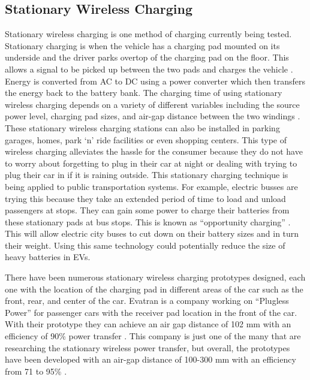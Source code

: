 \subsection{Stationary Wireless Charging }
Stationary wireless charging is one method of charging currently being tested. Stationary charging is when the 
vehicle has a charging pad mounted on its underside and the driver parks overtop of the charging pad on the floor. 
This allows a signal to be picked up between the two pads and charges the vehicle 
\cite{fisher_electric_2014}. Energy is converted from AC to DC using a power converter which then 
transfers the energy back to the battery bank. The charging time of using stationary wireless charging depends on a 
variety of different variables including the source power level, charging pad sizes, and air-gap distance between 
the two windings \cite{panchal_review_2018}. These stationary wireless charging stations can also be installed 
in parking garages, homes, park ‘n’ ride facilities or even shopping centers. This type of wireless charging 
alleviates the hassle for the consumer because they do not have to worry about forgetting to plug in their car at 
night or dealing with trying to plug their car in if it is raining outside. This stationary charging technique is 
being applied to public transportation systems. For example, electric busses are trying this because they take an 
extended period of time to load and unload passengers at stops. They can gain some power to charge their batteries 
from these stationary pads at bus stops. This is known as “opportunity charging” \cite{lukic_cutting_2013}. 
This will allow electric city buses to cut down on their battery sizes and in turn their weight. Using this same 
technology could potentially reduce the size of heavy batteries in EVs. 

There have been numerous stationary wireless charging prototypes designed, each one with the location of the 
charging pad in different areas of the car such as the front, rear, and center of the car. Evatran is a company 
working on “Plugless Power” for passenger cars with the receiver pad location in the front of the car. With their 
prototype they can achieve an air gap distance of 102 mm with an efficiency of 90\% power transfer 
\cite{panchal_review_2018}. This company is just one of the many that are researching the stationary wireless 
power transfer, but overall, the prototypes have been developed with an air-gap distance of 100-300 mm with an 
efficiency from 71 to 95\% \cite{panchal_review_2018}. 

